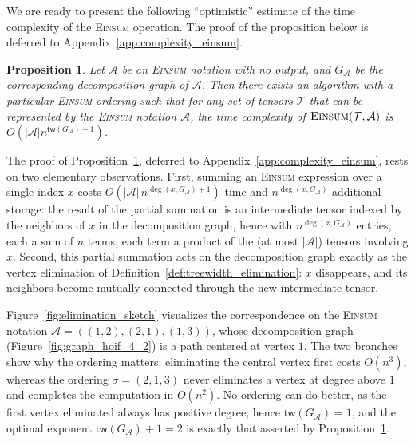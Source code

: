 \documentclass[sn-mathphys, natbib=false]{sn-jnl}
\theoremstyle{plain}
\newtheorem{proposition}{Proposition}
\theoremstyle{definition}
\def\Einsum{\textsc{Einsum}}
\newcommand{\tensorcontraction}{\textsc{Einsum}}
\newcommand{\degp}[2]{\deg(#1,#2)}
\newcommand{\treewidthp}[1]{\mathsf{tw}(#1)}
\newcommand{\less}{O}
\newif\ifshowchanges
\newcommand{\rev}[1]{%
  \ifshowchanges
    {\color{red} #1}%
  \else
    #1%
  \fi
}
\def\calA{\mathcal{A}}
\def\calT{\mathcal{T}}
\begin{document}
\begin{bibunit}[agsm]
We are ready to present the following ``optimistic'' estimate of the time complexity of the \Einsum{} operation. The proof of the proposition below is deferred to Appendix~\ref{app:complexity_einsum}.

\begin{proposition}
\label{pro:complexity_einsum}
Let $\calA$ be an \Einsum{} notation with no output, and $G_\calA$ be the corresponding decomposition graph of $\calA$. Then there exists an algorithm with a particular \Einsum{} ordering such that for any set of tensors $\calT$ that can be represented by the \Einsum{} notation $\calA$, the time complexity of $\tensorcontraction(\calT, \calA)$ is $\less(|\calA|n^{\treewidthp{G_\calA}+1})$. 
\end{proposition}


\rev{The proof of Proposition~\ref{pro:complexity_einsum}, deferred to Appendix~\ref{app:complexity_einsum}, rests on two elementary observations. First, summing an \Einsum{} expression over a single index $x$ costs $\less(|\calA|\, n^{\degp{x}{G_{\calA}} + 1})$ time and $n^{\degp{x}{G_{\calA}}}$ additional storage: the result of the partial summation is an intermediate tensor indexed by the neighbors of $x$ in the decomposition graph, hence with $n^{\degp{x}{G_{\calA}}}$ entries, each a sum of $n$ terms, each term a product of the (at most $|\calA|$) tensors involving $x$. Second, this partial summation acts on the decomposition graph exactly as the vertex elimination of Definition~\ref{def:treewidth_elimination}: $x$ disappears, and its neighbors become mutually connected through the new intermediate tensor. }

\rev{Figure~\ref{fig:elimination_sketch} visualizes the correspondence on the \Einsum{} notation $\calA = ((1,2), (2,1), (1,3))$, whose decomposition graph (Figure~\ref{fig:graph_hoif_4_2}) is a path centered at vertex $1$. The two branches show why the ordering matters: eliminating the central vertex first costs $\less(n^{3})$, whereas the ordering $\sigma = (2, 1, 3)$ never eliminates a vertex at degree above $1$ and completes the computation in $\less(n^{2})$. No ordering can do better, as the first vertex eliminated always has positive degree; hence $\treewidthp{G_{\calA}} = 1$, and the optimal exponent $\treewidthp{G_{\calA}} + 1 = 2$ is exactly that asserted by Proposition~\ref{pro:complexity_einsum}.}


\end{bibunit}
\end{document}
